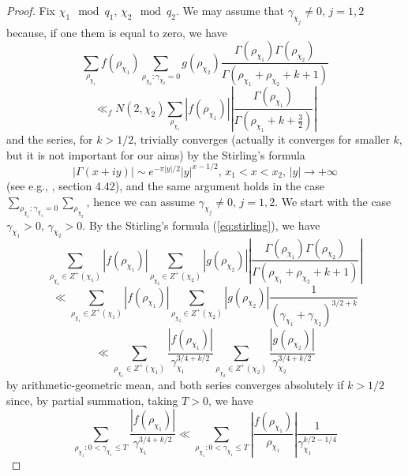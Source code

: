 \documentclass[10pt,a4paper]{amsart}
\numberwithin{equation}{section}
\numberwithin{figure}{section}
\begin{document}
\begin{proof}
Fix $\chi_{1}\mod q_{1},\,\chi_{2}\mod q_{2}$. We may assume that
$\gamma_{\chi_{j}}\neq0,\,j=1,2$ because, if one them is equal to
zero, we have
\[
\sum_{\rho_{\chi_{1}}}f\left(\rho_{\chi_{1}}\right)\sum_{\rho_{\chi_{2}}:\gamma_{\chi_{2}}=0}g\left(\rho_{\chi_{2}}\right)\frac{\Gamma\left(\rho_{\chi_{1}}\right)\Gamma\left(\rho_{\chi_{2}}\right)}{\Gamma\left(\rho_{\chi_{1}}+\rho_{\chi_{2}}+k+1\right)}
\]
\[
\ll_{f}N\left(2,\chi_{2}\right)\sum_{\rho_{\chi_{1}}}\left|f\left(\rho_{\chi_{1}}\right)\right|\left|\frac{\Gamma\left(\rho_{\chi_{1}}\right)}{\Gamma\left(\rho_{\chi_{1}}+k+\frac{3}{2}\right)}\right|
\]
and the series, for $k>1/2$, trivially converges (actually it converges
for smaller $k$, but it is not important for our aims) by the Stirling's
formula
\begin{equation}
\left|\Gamma\left(x+iy\right)\right|\sim e^{-\pi\left|y\right|/2}\left|y\right|^{x-1/2},\,x_{1}<x<x_{2},\,\left|y\right|\rightarrow+\infty\label{eq:stirling}
\end{equation}
(see e.g., \cite{TIT}, section 4.42), and the same argument holds
in the case $\sum_{\rho_{\chi_{1}}:\gamma_{\chi_{1}}=0}\sum_{\rho_{\chi_{2}}}$,
hence we can assume $\gamma_{\chi_{j}}\neq0,\,j=1,2$. We start with
the case $\gamma_{\chi_{1}}>0,\,\gamma_{\chi_{2}}>0$. By the Stirling's
formula (\ref{eq:stirling}), we have
\[
\sum_{\rho_{\chi_{1}}\in Z^{+}\left(\chi_{1}\right)}\left|f\left(\rho_{\chi_{1}}\right)\right|\sum_{\rho_{\chi_{2}}\in Z^{+}\left(\chi_{2}\right)}\left|g\left(\rho_{\chi_{2}}\right)\right|\left|\frac{\Gamma\left(\rho_{\chi_{1}}\right)\Gamma\left(\rho_{\chi_{2}}\right)}{\Gamma\left(\rho_{\chi_{1}}+\rho_{\chi_{2}}+k+1\right)}\right|
\]
\[
\ll\sum_{\rho_{\chi_{1}}\in Z^{+}\left(\chi_{1}\right)}\left|f\left(\rho_{\chi_{1}}\right)\right|\sum_{\rho_{\chi_{2}}\in Z^{+}\left(\chi_{2}\right)}\left|g\left(\rho_{\chi_{2}}\right)\right|\frac{1}{\left(\gamma_{\chi_{1}}+\gamma_{\chi_{2}}\right)^{3/2+k}}
\]
\[
\ll\sum_{\rho_{\chi_{1}}\in Z^{+}\left(\chi_{1}\right)}\frac{\left|f\left(\rho_{\chi_{1}}\right)\right|}{\gamma_{\chi_{1}}^{3/4+k/2}}\sum_{\rho_{\chi_{2}}\in Z^{+}\left(\chi_{2}\right)}\frac{\left|g\left(\rho_{\chi_{2}}\right)\right|}{\gamma_{\chi_{2}}^{3/4+k/2}}
\]
by arithmetic-geometric mean, and both series converges absolutely
if $k>1/2$ since, by partial summation, taking $T>0$, we have
\[
\sum_{\rho_{\chi_{1}}:0<\gamma_{\chi_{1}}\leq T}\frac{\left|f\left(\rho_{\chi_{1}}\right)\right|}{\gamma_{\chi_{1}}^{3/4+k/2}}\ll\sum_{\rho_{\chi_{1}}:0<\gamma_{\chi_{1}}\leq T}\left|\frac{f\left(\rho_{\chi_{1}}\right)}{\rho_{\chi_{1}}}\right|\frac{1}{\gamma_{\chi_{1}}^{k/2-1/4}}
\]
\end{proof}
\end{document}
